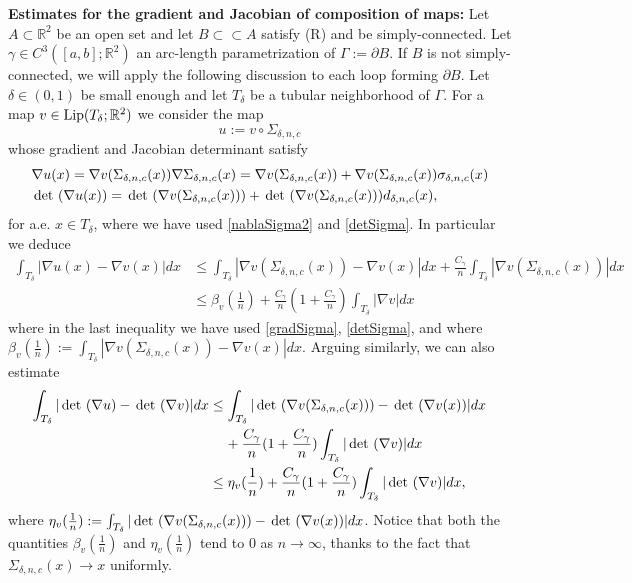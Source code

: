 \documentclass[a4paper,11pt]{article}
\numberwithin{equation}{section}
\def\det{\,{\rm det\ }}
\newcommand{\R}{\mathbb{R}}
\begin{document}
\textbf{Estimates for the gradient and Jacobian of composition of maps:}
Let $A\subset\R^2$ be an open set and let $B\subset\subset A$ satisfy (R) and be simply-connected. Let $\gamma\in C^3([a,b];\R^2)$ an arc-length parametrization of $\Gamma:=\partial B$. If $B$ is not simply-connected, we will apply the following discussion to each loop forming $\partial B$. Let $\delta\in(0,1)$ be small enough and let $T_\delta$ be a tubular neighborhood of $\Gamma$. For a map $v\in \text{{\rm Lip}}(T_\delta;\R^2)$ we consider the map $$u:=v\circ \Sigma_{\delta,n,c}$$ whose gradient and Jacobian determinant satisfy
\begin{align}\label{composedmap}
	&\nabla u(x)= \nabla v(\Sigma_{\delta,n,c}(x))\nabla\Sigma_{\delta,n,c}(x)=\nabla v(\Sigma_{\delta,n,c}(x))+\nabla v(\Sigma_{\delta,n,c}(x))\sigma_{\delta,n,c}(x)\nonumber\\
	&\det(\nabla u(x))=\det(\nabla v(\Sigma_{\delta,n,c}(x)))+\det(\nabla v(\Sigma_{\delta,n,c}(x)))d_{\delta,n,c}(x),
\end{align}
for a.e. $x\in T_\delta$,
where we have used \eqref{nablaSigma2} and \eqref{detSigma}.
In particular we deduce
\begin{align}
	\int_{T_\delta}|\nabla u(x)-\nabla v(x)|dx&\leq\int_{T_\delta}|\nabla v(\Sigma_{\delta,n,c}(x))-\nabla v(x)|dx +\frac {C_\gamma}{n}\int_{T_\delta}|\nabla v(\Sigma_{\delta,n,c}(x))|dx\nonumber\\
	&\leq \beta_v(\frac1n)+\frac {C_\gamma}{n}(1+ \frac {C_\gamma}{n})\int_{T_\delta} |\nabla v|dx
\end{align}
where in the last inequality we have used \eqref{gradSigma}, \eqref{detSigma}, and where $\beta_v(\frac1n):=\int_{T_\delta}|\nabla v(\Sigma_{\delta,n,c}(x))-\nabla v(x)|dx$. Arguing similarly, we can also estimate
\begin{align}
	\int_{T_\delta}|\det(\nabla u)-\det(\nabla v)|dx&\leq 	\int_{T_\delta}|\det(\nabla v(\Sigma_{\delta,n,c}(x)))-\det(\nabla v(x))|dx\nonumber\\
	&\;\;\;\;+\frac {C_\gamma}{n}(1+ \frac {C_\gamma}{n})\int_{T_\delta}|\det(\nabla v)|dx\nonumber\\
	&\leq \eta_v(\frac1n)+\frac {C_\gamma}{n}(1+ \frac {C_\gamma}{n})\int_{T_\delta}|\det(\nabla v)|dx,
\end{align}
where $\eta_v(\frac1n):=\int_{T_\delta}|\det(\nabla v(\Sigma_{\delta,n,c}(x)))-\det(\nabla v(x))|dx$.
Notice that both the quantities $\beta_v(\frac1n)$ and $\eta_v(\frac1n)$ tend to $0$ as $n\rightarrow \infty$, thanks to the fact that $\Sigma_{\delta,n,c}(x)\rightarrow x$ uniformly.
\end{document}
